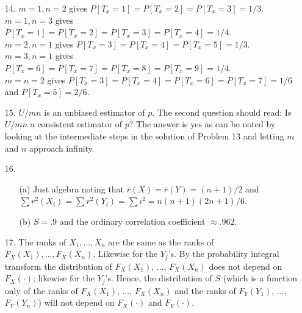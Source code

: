 \begin{enumerate}
	\newpage
	
	\item[14.] $m=1, n=2$ gives $P[T_x=1]=P[T_x=2]=P[T_x=3]=1/3$. \\
			$m=1, n=3$ gives $P[T_x=1]=P[T_x=2]=P[T_x=3]=P[T_x=4]=1/4$. \\
			$m=2, n=1$ gives $P[T_x=3]=P[T_x=4]=P[T_x=5]=1/3$. \\
			$m=3, n=1$ gives $P[T_x=6]=P[T_x=7]=P[T_x=8]=P[T_x=9]=1/4$. \\
			$m=n=2$ gives $P[T_x=3]=P[T_x=4]=P[T_x=6]=P[T_x=7]=1/6$ and $P[T_x=5]=2/6$. 
			
	\item[15.] $U/mn$ is an unbiased estimator of $p$. The second question should read: Is $U/mn$ a consistent estimator of $p$? The answer is yes as can be noted by looking at the intermediate steps in the solution of Problem 13 and letting $m$ and $n$ approach infinity.
	
	\item[16.] \begin{enumerate}
		\item[(a)] Just algebra noting that $\overline{r}(X)=\overline{r}(Y) = (n+1)/2$ and $\sum r^2(X_i)=\sum r^2(Y_i) = \sum i^2 = n(n+1)(2n+1)/6$.
		\item[(b)] $S=.9$ and the ordinary correlation coefficient $\approx .962$.
	\end{enumerate}
	
	\item[17.] The ranks of $X_1, \ldots, X_n$ are the same as the ranks of $F_X(X_1), \ldots, F_X(X_n)$. Likewise for the $Y_j$'s. By the probability integral transform the distribution of $F_X(X_1)$, $\ldots$, $F_X(X_n)$ does not depend on $F_X(\cdot)$; likewise for the $Y_j$'s. Hence, the distribution of $S$ (which is a function only of the ranks of $F_X(X_1)$, $\ldots$, $F_X(X_n)$ and the ranks of $F_Y(Y_1)$, $\ldots$, $F_Y(Y_n)$) will not depend on $F_X(\cdot)$ and $F_Y(\cdot)$.
	

\end{enumerate}
